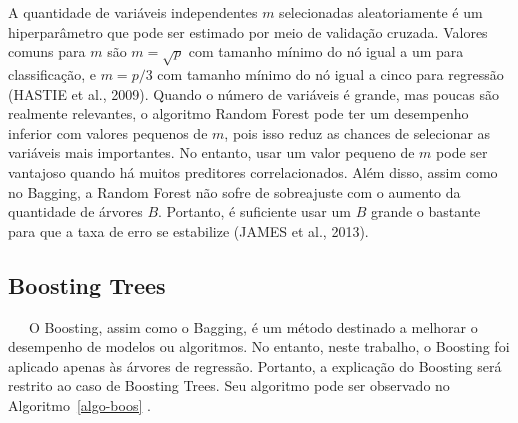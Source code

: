 \documentclass[
  12pt,
  a4paper,
]{scrreprt}
\begin{document}
\vspace{12pt}

A quantidade de variáveis independentes \(m\) selecionadas
aleatoriamente é um hiperparâmetro que pode ser estimado por meio de
validação cruzada. Valores comuns para \(m\) são
\(m=\sqrt{p}\)\hspace{0pt} com tamanho mínimo do nó igual a um para
classificação, e \(m=p/3\)\hspace{0pt} com tamanho mínimo do nó igual a
cinco para regressão (HASTIE et al., 2009). Quando o número de variáveis
é grande, mas poucas são realmente relevantes, o algoritmo Random Forest
pode ter um desempenho inferior com valores pequenos de \(m\), pois isso
reduz as chances de selecionar as variáveis mais importantes. No
entanto, usar um valor pequeno de \(m\) pode ser vantajoso quando há
muitos preditores correlacionados. Além disso, assim como no Bagging, a
Random Forest não sofre de sobreajuste com o aumento da quantidade de
árvores \(B\). Portanto, é suficiente usar um \(B\) grande o bastante
para que a taxa de erro se estabilize (JAMES et al., 2013).

\subsection{Boosting Trees}\label{boosting-trees}

~~~O Boosting, assim como o Bagging, é um método destinado a melhorar o
desempenho de modelos ou algoritmos. No entanto, neste trabalho, o
Boosting foi aplicado apenas às árvores de regressão. Portanto, a
explicação do Boosting será restrito ao caso de Boosting Trees. Seu
algoritmo pode ser observado no  Algoritmo~\ref{algo-boos} .

\vspace{12pt}
\end{document}
